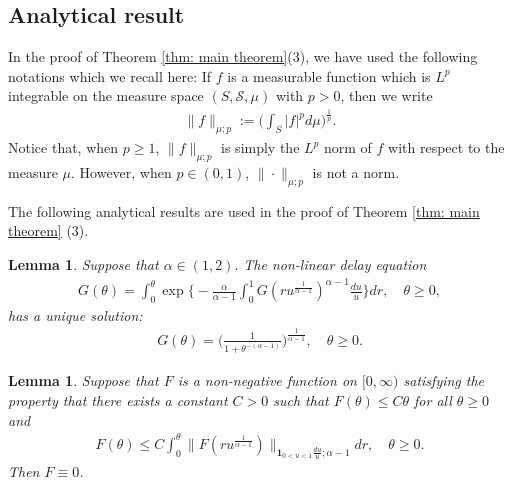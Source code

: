 \documentclass[12pt,a4paper]{amsart}
\newtheorem{lem}[thm]{Lemma}
\theoremstyle{definition}
\numberwithin{equation}{section}
\begin{document}
\subsection{Analytical result}
\label{sec: Characterizing the Zolotarev's distribution using an non-linear delay equation}
In the proof of Theorem \ref{thm: main theorem}(3), we have used the following notations which we recall here:
If $f$ is a measurable function which is $L^p$ integrable on the measure space $(S,\mathscr S,\mu)$ with $p > 0$, then we write
\begin{align}
	\|f\|_{\mu;p}
	:= \Big(\int_{S} |f|^p d\mu \Big)^{\frac{1}{p}}.
\end{align}
Notice that, when $p\geq 1$, $\|f\|_{\mu;p}$ is simply the $L^p$ norm of $f$ with respect to the measure $\mu$.	
However, when $p \in (0,1)$, $\|\cdot\|_{\mu; p}$ is not a norm.

The following analytical results are used in the proof of Theorem \ref{thm: main theorem} (3). 
\begin{lem} \label{lem: characterize the general Mittag-Leffler distribution}
  Suppose that $\alpha \in (1,2).$
  The non-linear delay equation
  \begin{align} \label{eq: equation for the distribution}
    G( \theta)
    = \int_0^\theta \exp\Big\{ - \frac{\alpha} {\alpha - 1} \int_0^1 G(ru^{\frac{1}{\alpha - 1} })^{\alpha - 1}\frac{du}{u} \Big\} dr,
    \quad \theta \geq 0,
  \end{align}
	has a unique solution:
  \begin{align}\label{eq: solution for the equation}
    G(\theta)
    = \Big(\frac{1}{1+\theta^{-(\alpha - 1)}}\Big)^{\frac{1}{\alpha - 1}},
    \quad \theta \geq 0.
  \end{align}
\end{lem}

\begin{lem}\label{lem: F is zero}
	Suppose that $F$ is a non-negative function on $[0,\infty)$ satisfying the property that there exists a constant $C>0$ such that  $F(\theta) \leq C\theta$ for all $\theta \geq 0$ and
  \begin{align}
    \label{eq:Gronwall_inequlity}
    F(\theta)
    \leq C \int_0^\theta \|  F(ru^{ \frac{1}{\alpha - 1}  })\|_{\mathbf 1_{0<u<1}\frac{du}{u}; \alpha - 1} dr, \quad \theta \geq 0.
  \end{align}
	Then $F \equiv 0$.
\end{lem}
\end{document}
